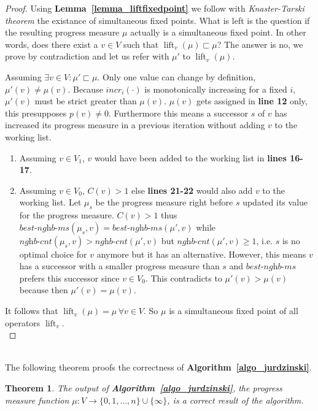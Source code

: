 \documentclass[12pt,oneside,bibliography=totoc,abstracton]{scrartcl}
\DeclareMathOperator{\lift}{lift}
\newcommand{\lemmaref}[1]{\textbf{Lemma~\ref{#1}}}
\newcommand{\algoref}[1]{\textbf{Algorithm~\ref{#1}}}
\newcommand{\libref}[1]{\textbf{\cite{#1}}}
\newtheorem{mytheorem}{Theorem}
\begin{document}
\begin{proof}
	Using \lemmaref{lemma_liftfixedpoint} we follow with
	\textit{Knaster-Tarski theorem} \libref{knaster_tarski} the existance of simultaneous fixed points.
	What is left is the question if the resulting progress measure $\mu$ actually is a simultaneous fixed point.
	In other words, does there exist a $v \in V$ such that $\lift_v(\mu) \sqsubset \mu$?
	The answer is no, we prove by contradiction and let us refer with $\mu'$ to $\lift_v(\mu)$.
	
	Assuming $\exists v \in V : \mu' \sqsubset \mu$.
	Only one value can change by definition, $\mu'(v) \ne \mu(v)$.
	Because $\textit{incr}_{i}(\cdot)$ is monotonically increasing for a fixed $i$, $\mu'(v)$
	must be strict greater than $\mu(v)$. $\mu(v)$ gets assigned in \textbf{line 12} only, this presupposes
	$p(v) \ne 0$. Furthermore this means a successor $s$ of $v$ has increased its
	progress measure in a previous iteration without adding $v$ to the working list.
	\begin{enumerate}
	\item Assuming $v \in V_1$, $v$ would have been added to the
		working list in \textbf{lines 16-17}. \lightning
	\item Assuming $v \in V_0$, $C(v) > 1$ else \textbf{lines 21-22}
		would also add $v$ to the working list. Let $\mu_s$ be the progress measure
		right before $s$ updated its value for the progress measure.
		$C(v) > 1$ thus $\textit{best-nghb-ms}(\mu_s, v) = \textit{best-nghb-ms}(\mu', v)$
		while $\textit{nghb-cnt}(\mu_s, v) > \textit{nghb-cnt}(\mu', v)$ but $\textit{nghb-cnt}(\mu', v) \ge 1$,
		i.e. $s$ is no optimal choice for $v$ anymore but it has an alternative.
		However, this means $v$ has a successor with a smaller progress
		measure than $s$ and $\textit{best-nghb-ms}$ prefers this successor since $v \in V_0$.
		This contradicts to $\mu'(v) > \mu(v)$ because then $\mu'(v) = \mu(v)$. \lightning
	\end{enumerate}
	It follows that $\lift_v(\mu) = \mu \, \forall v \in V$. So $\mu$ is a simultaneous fixed
	point of all operators $\lift_v$.\\
\end{proof}\quad\\
The following theorem proofs the correctness of \algoref{algo_jurdzinski}.
\begin{mytheorem}\label{theorem_algocorrect}
	The output of \algoref{algo_jurdzinski}, the progress measure function
	$\mu : V \to \{0, 1, \ldots, n\} \cup \{\infty\}$, is a \textnormal{correct result} of the algorithm.
\end{mytheorem}
\end{document}
